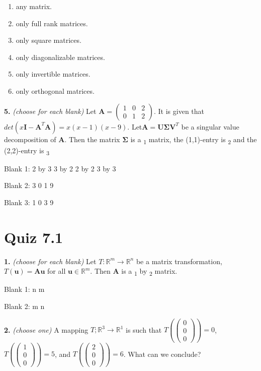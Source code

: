 \documentclass[10pt,a4paper]{article}
\begin{document}
\begin{enumerate}[label=(\Alph*)]
\item any matrix.
\item only full rank matrices.
\item only square matrices.
\item only diagonalizable matrices.
\item only invertible matrices.
\item only orthogonal matrices.
\end{enumerate}
\smallskip
\textbf{5.} \textit{(choose for each blank)} Let \(\mathbf{A}=\begin{pmatrix}1&0&2\\0&1&2\end{pmatrix}\). It is given that \(det(x\mathbf{I-A}^T\mathbf{A})=x(x-1)(x-9)\). Let\(\mathbf{A=U\Sigma V}^T\) be a singular value decomposition of \(\mathbf{A}\). Then the matrix \(\mathbf{\Sigma}\) is a  \underline{\hspace{1.2cm}}\textsubscript{1} 
 matrix, the (1,1)-entry is  \underline{\hspace{1.2cm}}\textsubscript{2} 
 and the (2,2)-entry is  \underline{\hspace{1.2cm}}\textsubscript{3}

\quad Blank 1: 2 by 3 \textbar{} 3 by 2 \textbar{} 2 by 2 \textbar{} 3 by 3

\quad Blank 2: 3 \textbar{} 0 \textbar{} 1 \textbar{} 9

\quad Blank 3: 1 \textbar{} 0 \textbar{} 3 \textbar{} 9

\smallskip
\section{Quiz 7.1}
\textbf{1.} \textit{(choose for each blank)} Let \(T:\mathbb{R}^m\to\mathbb{R}^n\) be a matrix transformation, \(T(\mathbf{u})=\mathbf{Au}\) for all \(\mathbf{u}\in\mathbb{R}^m\). Then \(\mathbf{A}\) is a  \underline{\hspace{1.2cm}}\textsubscript{1} 
 by  \underline{\hspace{1.2cm}}\textsubscript{2} 
 matrix.

\quad Blank 1: n \textbar{} m

\quad Blank 2: m \textbar{} n

\smallskip
\textbf{2.} \textit{(choose one)} A mapping \(T;\mathbb{R}^3\to\mathbb{R}^1\) is such that \(T\left(\begin{pmatrix}0\\0\\0\end{pmatrix} \right)=0\), \(T\left(\begin{pmatrix}1\\0\\0\end{pmatrix} \right)=5\), and \(T\left(\begin{pmatrix}2\\0\\0\end{pmatrix} \right)=6\). What can we conclude?
\end{document}
